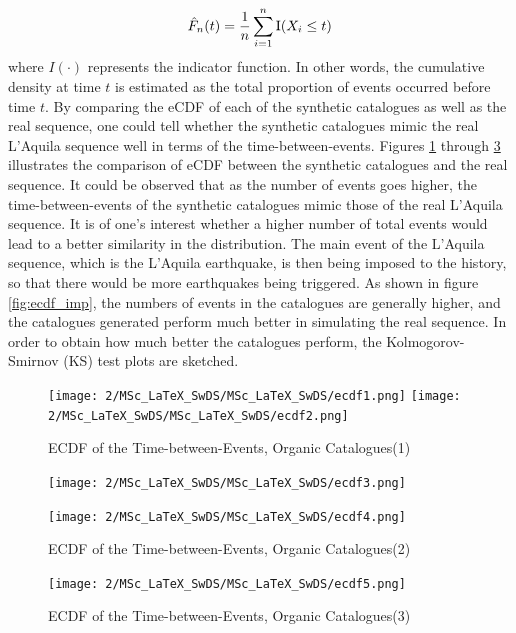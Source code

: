 \documentclass[11pt,twoside]{article}
\numberwithin{Theorem}{section}
\numberwithin{Definition}{section}
\numberwithin{Lemma}{section}
\numberwithin{Algorithm}{section}
\numberwithin{equation}{section}
\begin{document}
\begin{equation}\label{eqn:ecdf}
\hat F_n (t) = \frac{1}{n}\sum\limits_{i = 1}^n {{\rm I}({X_i} \le t)}
\end{equation}
\noindent
where $I(\cdot)$ represents the indicator function. In other words, the cumulative density at time $t$ is estimated as the total proportion of events occurred before time $t$. By comparing the eCDF of each of the synthetic catalogues as well as the real sequence, one could tell whether the synthetic catalogues mimic the real L'Aquila sequence well in terms of the time-between-events. Figures \ref{fig:ecdf1}  through \ref{fig:ecdf3}  illustrates the comparison of eCDF between the synthetic catalogues and the real sequence. It could be observed that as the number of events goes higher, the time-between-events of the synthetic catalogues mimic those of the real L'Aquila sequence. It is of one's interest whether a higher number of total events would lead to a better similarity in the distribution. The main event of the L'Aquila sequence, which is the L'Aquila earthquake, is then being imposed to the history, so that there would be more earthquakes being triggered. As shown in figure \ref{fig:ecdf_imp}, the numbers of events in the catalogues are generally higher, and the catalogues generated perform much better in simulating the real sequence. In order to obtain how much better the catalogues perform, the Kolmogorov-Smirnov (KS) test plots are sketched. 

\begin{figure}[H]
\centering
\texttt{[image: 2/MSc\_LaTeX\_SwDS/MSc\_LaTeX\_SwDS/ecdf1.png]}
\texttt{[image: 2/MSc\_LaTeX\_SwDS/MSc\_LaTeX\_SwDS/ecdf2.png]}

\caption{ECDF of the Time-between-Events, Organic Catalogues(1)}
\label{fig:ecdf1}
\end{figure}

\begin{figure}[H]
\centering

\texttt{[image: 2/MSc\_LaTeX\_SwDS/MSc\_LaTeX\_SwDS/ecdf3.png]}
\caption{ECDF of the Time-between-Events, Organic Catalogues(2)}
\texttt{[image: 2/MSc\_LaTeX\_SwDS/MSc\_LaTeX\_SwDS/ecdf4.png]}

\label{fig:ecdf2}
\end{figure}

\begin{figure}[H]
\centering

\texttt{[image: 2/MSc\_LaTeX\_SwDS/MSc\_LaTeX\_SwDS/ecdf5.png]}
\caption{ECDF of the Time-between-Events, Organic Catalogues(3)}
\label{fig:ecdf3}
\end{figure}
\end{document}
